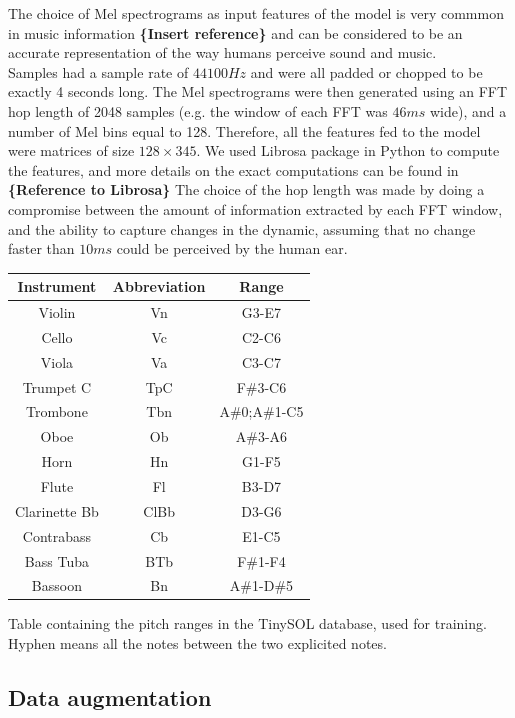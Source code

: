 \documentclass{article}
\begin{document}
The choice of Mel spectrograms as input features of the model is very commmon in music information \textbf{\{Insert reference\}} and can be considered to be an accurate representation of the way humans perceive sound and music.\\

Samples had a sample rate of $44100Hz$ and were all padded or chopped to be exactly 4 seconds long. The Mel spectrograms were then generated using an FFT hop length of 2048 samples (e.g. the window of each FFT was $46ms$ wide), and a number of Mel bins equal to 128. Therefore, all the features fed to the model were matrices of size $128\times 345$. We used Librosa package in Python to compute the features, and more details on the exact computations can be found in \textbf{\{Reference to Librosa\}} The choice of the hop length was made by doing a compromise between the amount of information extracted by each FFT window, and the ability to capture changes in the dynamic, assuming that no change faster than $10ms$ could be perceived by the human ear.

\begin{table}
\begin{tabular}{|c|c|c|}
\hline
Instrument & Abbreviation & Range \\
\hline
Violin & Vn & G3-E7\\
Cello & Vc & C2-C6\\
Viola & Va & C3-C7\\
Trumpet C & TpC & F\#3-C6\\
Trombone & Tbn & A\#0;A\#1-C5\\
Oboe & Ob & A\#3-A6\\
Horn & Hn & G1-F5\\
Flute & Fl & B3-D7\\
Clarinette Bb & ClBb & D3-G6\\
Contrabass & Cb & E1-C5\\
Bass Tuba & BTb & F\#1-F4\\
Bassoon & Bn & A\#1-D\#5\\
\hline
\end{tabular}
\begin{caption}Table containing the pitch ranges in the TinySOL database, used for training. Hyphen means all the notes between the two explicited notes. \label{tab_pitch}
\end{caption}
\end{table}

\subsection{Data augmentation}
\end{document}
